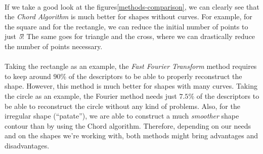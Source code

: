 \clearpage

\paragraph{}
If we take a good look at the figures\ref{methods-comparison}, we can clearly see that the \emph{Chord Algorithm} is much better for shapes without curves.
For example, for the square and for the rectangle, we can reduce the initial number of points to just \emph{5}!
The same goes for triangle and the cross, where we can drastically reduce the number of points necessary.
\paragraph{}
Taking the rectangle as an example, the \emph{Fast Fourier Transform} method requires to keep around $90\%$ of the descriptors to be able to properly reconstruct the shape.
However, this method is much better for shapes with many curves.
Taking the circle as an example, the Fourier method needs just $7.5\%$ of the descriptors to be able to reconstruct the circle without any kind of problems.
Also, for the irregular shape (``patate''), we are able to construct a much \emph{smoother} shape contour than by using the Chord algorithm.
Therefore, depending on our needs and on the shapes we're working with, both methods might bring advantages and disadvantages.
